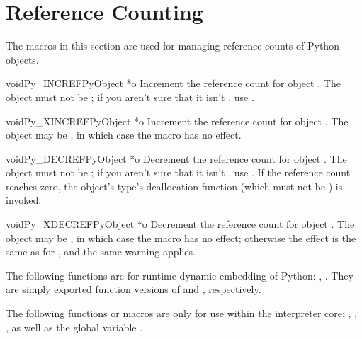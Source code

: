 \chapter{Reference Counting \label{countingRefs}}


The macros in this section are used for managing reference counts
of Python objects.


\begin{cfuncdesc}{void}{Py_INCREF}{PyObject *o}
  Increment the reference count for object .  The object must
  not be \NULL; if you aren't sure that it isn't \NULL, use
  .
\end{cfuncdesc}

\begin{cfuncdesc}{void}{Py_XINCREF}{PyObject *o}
  Increment the reference count for object .  The object may be
  \NULL, in which case the macro has no effect.
\end{cfuncdesc}

\begin{cfuncdesc}{void}{Py_DECREF}{PyObject *o}
  Decrement the reference count for object .  The object must
  not be \NULL; if you aren't sure that it isn't \NULL, use
  .  If the reference count reaches zero, the
  object's type's deallocation function (which must not be \NULL) is
  invoked.

\end{cfuncdesc}

\begin{cfuncdesc}{void}{Py_XDECREF}{PyObject *o}
  Decrement the reference count for object .  The object may be
  \NULL, in which case the macro has no effect; otherwise the effect
  is the same as for , and the same warning
  applies.
\end{cfuncdesc}

The following functions are for runtime dynamic embedding of Python:
, .
They are simply exported function versions of  and 
, respectively.

The following functions or macros are only for use within the
interpreter core: ,
, , as
well as the global variable .
